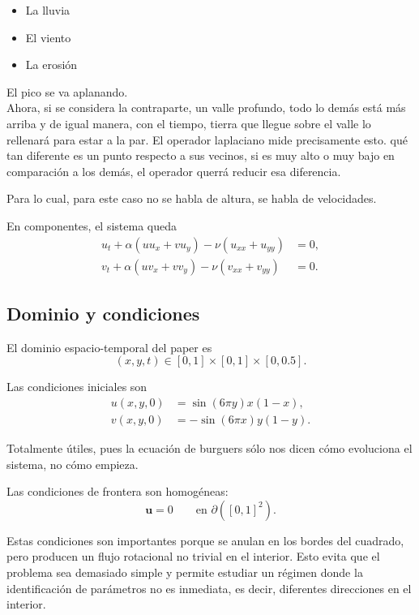 \documentclass[10pt,letterpaper,twocolumn]{article}
\begin{document}
\begin{itemize}[leftmargin=*]
    \item La lluvia 
    \item El viento
    \item La erosión
\end{itemize}

El pico se va aplanando.\\

Ahora, si se considera la contraparte, un valle profundo, todo lo demás está más arriba y de igual manera, con el tiempo, tierra que llegue sobre el valle lo rellenará para estar a la par. El operador laplaciano mide precisamente esto. qué tan diferente es un punto respecto a sus vecinos, si es muy alto o muy bajo en comparación a los demás, el operador querrá reducir esa diferencia.

Para lo cual, para este caso no se habla de altura, se habla de velocidades.

En componentes, el sistema queda
\begin{align}
    u_t+\alpha(uu_x+vu_y)-\nu(u_{xx}+u_{yy})&=0,\label{eq:fu}\\
    v_t+\alpha(uv_x+vv_y)-\nu(v_{xx}+v_{yy})&=0.\label{eq:fv}
\end{align}

\subsection{Dominio y condiciones}

El dominio espacio-temporal del paper es
\begin{equation}
    (x,y,t)\in [0,1]\times[0,1]\times[0,0.5].
\end{equation}

Las condiciones iniciales son
\begin{align}
    u(x,y,0)&=\sin(6\pi y)x(1-x),\label{eq:ic_u}\\
    v(x,y,0)&=-\sin(6\pi x)y(1-y).\label{eq:ic_v}
\end{align}

Totalmente útiles, pues la ecuación de burguers sólo nos dicen cómo evoluciona el sistema, no cómo empieza.

Las condiciones de frontera son homogéneas:
\begin{equation}
    \mathbf{u}=0\qquad \text{en }\partial([0,1]^2).
    \label{eq:bc}
\end{equation}

Estas condiciones son importantes porque se anulan en los bordes del cuadrado, pero producen un flujo rotacional no trivial en el interior. Esto evita que el problema sea demasiado simple y permite estudiar un régimen donde la identificación de parámetros no es inmediata, es decir, diferentes direcciones en el interior. 
\end{document}
